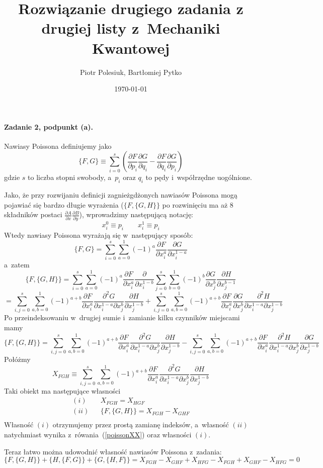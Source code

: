 \documentclass{article}
\title{Rozwiązanie drugiego zadania z drugiej listy z~Mechaniki Kwantowej}
\author{Piotr Polesiuk, Bartłomiej Pytko}
\date{\today}
\newcommand*{\pd}[2]{\frac{\partial #1}{\partial #2}}
\newcommand*{\pdd}[3]{\frac{\partial^2 #1}{\partial #2 \partial #3}}
\begin{document}
\maketitle

\paragraph{Zadanie 2, podpunkt (a).}

Nawiasy Poissona definiujemy jako
\[
\{F,G\} \equiv \sum_{i=0}^s
\left(\pd{F}{p_i}\pd{G}{q_i} - \pd{F}{q_i}\pd{G}{p_i}\right)
\]
gdzie $s$ to liczba stopni swobody, a~$p_i$ oraz $q_i$ to pędy 
i~współrzędne uogólnione.

Jako, że przy rozwijaniu definicji zagnieżgdżonych nawiasów Poissona mogą
pojawiać się bardzo długie wyrażenia ($\{F,\{G,H\}\}$ po rozwinięciu
ma aż 8 składników postaci $\pd{A}{x}\pd{B}{y}$), wprowadzimy następującą
notację:
\[
x_i^0 \equiv p_i \qquad x_i^1 \equiv p_i
\]
Wtedy nawiasy Poissona wyrażają się w~następujący sposób:
\[
\{F,G\} = \sum_{i=0}^s\sum_{a=0}^1 (-1)^a \pd{F}{x_i^a}\pd{G}{x_i^{1-a}}
\]
a~zatem
\[
\{F,\{G,H\}\} = \sum_{i=0}^s\sum_{a=0}^1 (-1)^a \pd{F}{x_i^a}\pd{}{x_i^{1-b}}
\sum_{j=0}^s\sum_{b=0}^1 (-1)^b \pd{G}{x_j^b}\pd{H}{x_j^{b-1}}
\]
\[
= \sum_{i,j=0}^s\sum_{a,b=0}^1 (-1)^{a+b}
\pd{F}{x_i^a} \pdd{G}{x_i^{1-a}}{x_j^b} \pd{H}{x_j^{1-b}}
+ \sum_{i,j=0}^s\sum_{a,b=0}^1 (-1)^{a+b}
\pd{F}{x_i^a} \pd{G}{x_j^b} \pdd{H}{x_i^{1-a}}{x_j^{1-b}}
\]
Po przeindeksowaniu w~drugiej sumie i~zamianie kilku czynników miejscami mamy
\begin{equation}\label{poissonXX}
\{F, \{G,H\}\}
= \sum_{i,j=0}^s\sum_{a,b=0}^1 (-1)^{a+b}
\pd{F}{x_i^a} \pdd{G}{x_i^{1-a}}{x_j^b} \pd{H}{x_j^{1-b}}
- \sum_{i,j=0}^s\sum_{a,b=0}^1 (-1)^{a+b}
\pd{F}{x_i^a} \pdd{H}{x_i^{1-a}}{x_j^{b}} \pd{G}{x_j^{1-b}}
\end{equation}
Połóżmy
\[
X_{FGH} \equiv \sum_{i,j=0}^s\sum_{a,b=0}^1 (-1)^{a+b}
\pd{F}{x_i^a} \pdd{G}{x_i^{1-a}}{x_j^b} \pd{H}{x_j^{1-b}}
\]
Taki obiekt ma następujące własności
\begin{eqnarray*}
(i)  && X_{FGH} = X_{HGF} \\
(ii) && \{F,\{G,H\}\} = X_{FGH} - X_{GHF} \\
\end{eqnarray*}
Własność $(i)$ otrzymujemy przez prostą zamianę indeksów,
a~własność $(ii)$ natychmiast wynika z~rówania~(\ref{poissonXX}) oraz
własności $(i)$.

Teraz łatwo można udowodnić własność nawiasów Poissona z~zadania:
\[
\{F,\{G,H\}\} + \{H,\{F,G\}\} + \{G,\{H,F\}\} =
X_{FGH} - X_{GHF} + X_{HFG} - X_{FGH} + X_{GHF} - X_{HFG} = 0
\]
\end{document}
